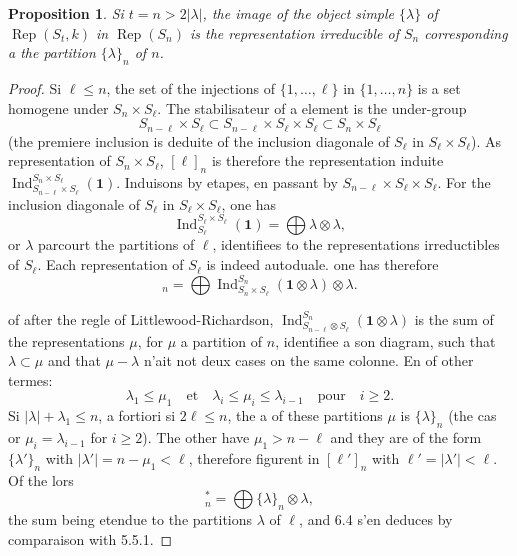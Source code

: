 \documentclass[11pt,a4paper]{article}
\theoremstyle{plain}
\newtheorem{proposition}[theorem]{Proposition}
\theoremstyle{definition}
\DeclareMathOperator{\Ind}{Ind}
\DeclareMathOperator{\Rep}{Rep}
\begin{document}
\begin{proposition}
Si $t = n > 2|\lambda|$, the image of the object simple $\{\lambda\}$ of $\Rep(S_t, k)$ in $\Rep(S_n)$ is the representation irreducible of $S_n$ corresponding a the partition $\{\lambda\}_n$ of $n$.
\end{proposition}

\begin{proof}
Si $\ell \leq n$, the set of the injections of $\{1, \ldots, \ell\}$ in $\{1, \ldots, n\}$ is a set homogene under $S_n \times S_\ell$. The stabilisateur of a element is the under-group
\[
S_{n-\ell} \times S_\ell \subset S_{n-\ell} \times S_\ell \times S_\ell \subset S_n \times S_\ell
\]
(the premiere inclusion is deduite of the inclusion diagonale of $S_\ell$ in $S_\ell \times S_\ell$). As representation of $S_n \times S_\ell$, $[\ell]_n$ is therefore the representation induite $\Ind_{S_{n-\ell} \times S_\ell}^{S_n \times S_\ell}(\mathbf{1})$. Induisons by etapes, en passant by $S_{n-\ell} \times S_\ell \times S_\ell$. For the inclusion diagonale of $S_\ell$ in $S_\ell \times S_\ell$, one has
\[
\Ind_{S_\ell}^{S_\ell \times S_\ell}(\mathbf{1}) = \bigoplus \lambda \otimes \lambda,
\]
or $\lambda$ parcourt the partitions of $\ell$, identifiees to the representations irreductibles of $S_\ell$. Each representation of $S_\ell$ is indeed autoduale. one has therefore
\begin{equation}
[\ell]_n = \bigoplus \Ind_{S_n \times S_\ell}^{S_n}(\mathbf{1} \otimes \lambda) \otimes \lambda. \tag{6.4.1}
\end{equation}

of after the regle of Littlewood-Richardson, $\Ind_{S_{n-\ell} \otimes S_\ell}^{S_n}(\mathbf{1} \otimes \lambda)$ is the sum of the representations $\mu$, for $\mu$ a partition of $n$, identifiee a son diagram, such that $\lambda \subset \mu$ and that $\mu - \lambda$ n'ait not deux cases on the same colonne. En of other termes:
\[
\lambda_1 \leq \mu_1 \quad \text{et} \quad \lambda_i \leq \mu_i \leq \lambda_{i-1} \quad \text{pour} \quad i \geq 2.
\]
Si $|\lambda| + \lambda_1 \leq n$, a fortiori si $2\ell \leq n$, the a of these partitions $\mu$ is $\{\lambda\}_n$ (the cas or $\mu_i = \lambda_{i-1}$ for $i \geq 2$). The other have $\mu_1 > n - \ell$ and they are of the form $\{\lambda'\}_n$ with $|\lambda'| = n - \mu_1 < \ell$, therefore figurent in $[\ell']_n$ with $\ell' = |\lambda'| < \ell$. Of the lors
\begin{equation}
[\ell]^*_n = \bigoplus \{\lambda\}_n \otimes \lambda, \tag{6.4.2}
\end{equation}
the sum being etendue to the partitions $\lambda$ of $\ell$, and 6.4 s'en deduces by comparaison with 5.5.1.
\end{proof}
\end{document}

